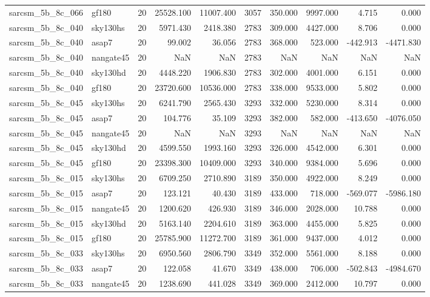 \documentclass{article}
\begin{document}
\begin{longtable}{llrrrrrrrr}
sarcsm\_5b\_8c\_066 & gf180 & 20 & 25528.100 & 11007.400 & 3057 & 350.000 & 9997.000 & 4.715 & 0.000 \\
sarcsm\_5b\_8c\_040 & sky130hs & 20 & 5971.430 & 2418.380 & 2783 & 309.000 & 4427.000 & 8.706 & 0.000 \\
sarcsm\_5b\_8c\_040 & asap7 & 20 & 99.002 & 36.056 & 2783 & 368.000 & 523.000 & -442.913 & -4471.830 \\
sarcsm\_5b\_8c\_040 & nangate45 & 20 & NaN & NaN & 2783 & NaN & NaN & NaN & NaN \\
sarcsm\_5b\_8c\_040 & sky130hd & 20 & 4448.220 & 1906.830 & 2783 & 302.000 & 4001.000 & 6.151 & 0.000 \\
sarcsm\_5b\_8c\_040 & gf180 & 20 & 23720.600 & 10536.000 & 2783 & 338.000 & 9533.000 & 5.802 & 0.000 \\
sarcsm\_5b\_8c\_045 & sky130hs & 20 & 6241.790 & 2565.430 & 3293 & 332.000 & 5230.000 & 8.314 & 0.000 \\
sarcsm\_5b\_8c\_045 & asap7 & 20 & 104.776 & 35.109 & 3293 & 382.000 & 582.000 & -413.650 & -4076.050 \\
sarcsm\_5b\_8c\_045 & nangate45 & 20 & NaN & NaN & 3293 & NaN & NaN & NaN & NaN \\
sarcsm\_5b\_8c\_045 & sky130hd & 20 & 4599.550 & 1993.160 & 3293 & 326.000 & 4542.000 & 6.301 & 0.000 \\
sarcsm\_5b\_8c\_045 & gf180 & 20 & 23398.300 & 10409.000 & 3293 & 340.000 & 9384.000 & 5.696 & 0.000 \\
sarcsm\_5b\_8c\_015 & sky130hs & 20 & 6709.250 & 2710.890 & 3189 & 350.000 & 4922.000 & 8.249 & 0.000 \\
sarcsm\_5b\_8c\_015 & asap7 & 20 & 123.121 & 40.430 & 3189 & 433.000 & 718.000 & -569.077 & -5986.180 \\
sarcsm\_5b\_8c\_015 & nangate45 & 20 & 1200.620 & 426.930 & 3189 & 346.000 & 2028.000 & 10.788 & 0.000 \\
sarcsm\_5b\_8c\_015 & sky130hd & 20 & 5163.140 & 2204.610 & 3189 & 363.000 & 4455.000 & 5.825 & 0.000 \\
sarcsm\_5b\_8c\_015 & gf180 & 20 & 25785.900 & 11272.700 & 3189 & 361.000 & 9437.000 & 4.012 & 0.000 \\
sarcsm\_5b\_8c\_033 & sky130hs & 20 & 6950.560 & 2806.790 & 3349 & 352.000 & 5561.000 & 8.188 & 0.000 \\
sarcsm\_5b\_8c\_033 & asap7 & 20 & 122.058 & 41.670 & 3349 & 438.000 & 706.000 & -502.843 & -4984.670 \\
sarcsm\_5b\_8c\_033 & nangate45 & 20 & 1238.690 & 441.028 & 3349 & 369.000 & 2412.000 & 10.797 & 0.000 \\

\end{longtable}
\end{document}
